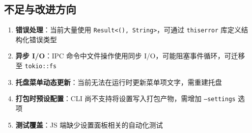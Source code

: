 \documentclass[12pt,a4paper]{ctexart}
\begin{document}
\subsection{不足与改进方向}

\begin{enumerate}[label=(\arabic*)]
  \item \textbf{错误处理}：当前大量使用 \texttt{Result<(), String>}，可通过 \texttt{thiserror} 库定义结构化错误类型
  \item \textbf{异步 I/O}：IPC 命令中文件操作使用同步 I/O，可能阻塞事件循环，可迁移至 \texttt{tokio::fs}
  \item \textbf{托盘菜单动态更新}：当前无法在运行时更新菜单项文字，需重建托盘
  \item \textbf{打包时预设配置}：CLI 尚不支持将设置写入打包产物，需增加 \texttt{---settings} 选项
  \item \textbf{测试覆盖}：JS 端缺少设置面板相关的自动化测试
\end{enumerate}
\end{document}
